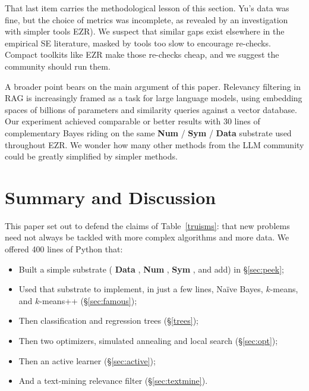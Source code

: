 \documentclass[AMA,STIX2COL]{WileyNJDv5}
\newcommand{\IT}{{\sffamily EZR}}
\newcommand{\cls}[1]{%
  \setlength{\fboxsep}{1.5pt}%
  \colorbox{clsbg}{\sffamily\bfseries{#1}}%
}
\begin{document}
{{That last item carries the methodological lesson of this
section. Yu's data was fine, but the choice of metrics was
incomplete, as revealed by an investigation with  simpler tools
  \IT{}).
We suspect that
similar gaps exist elsewhere in the empirical SE literature,
masked by tools too slow to encourage re-checks. Compact
toolkits like EZR make those re-checks cheap, and we suggest
the community should run them.

A broader point bears on the main argument of this paper.
Relevancy filtering in RAG is increasingly framed as a task for large
language models, using embedding spaces of billions of
parameters and similarity queries against a vector database.
Our experiment achieved comparable or better results with 30
lines of complementary Bayes riding on the same
\cls{Num}/\cls{Sym}/\cls{Data} substrate used throughout
EZR. We wonder how many other methods from the LLM community could be greatly simplified by simpler methods.



\section{Summary and Discussion}\label{sec:disc}

This paper set out to defend the claims of
Table~\ref{truisms}: that new problems need not always be
tackled with more complex algorithms and more data. We
offered 400 lines of Python that:
\begin{itemize}
\item Built a simple substrate (\cls{Data}, \cls{Num},
\cls{Sym}, and \textsf{add}) in \S\ref{sec:peek};
\item Used that substrate to implement, in just a few lines,
Naïve Bayes, $k$-means, and $k$-means++ (\S\ref{sec:famous});
\item Then classification and regression trees
(\S\ref{trees});
\item Then two optimizers, simulated annealing and local
search (\S\ref{sec:opt});
\item Then an active learner (\S\ref{sec:active});
\item And a text-mining relevance filter
(\S\ref{sec:textmine}).
\end{itemize}

}}
\end{document}
